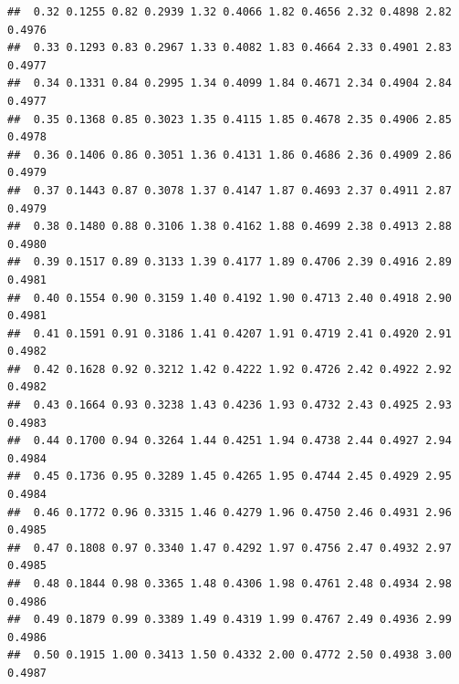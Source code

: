 \documentclass[onecolumn,12pt]{book}\usepackage[]{graphicx}\usepackage[]{color}
\makeatletter
\newenvironment{kframe}{%
 \def\at@end@of@kframe{}%
 \ifinner\ifhmode%
  \def\at@end@of@kframe{\end{minipage}}%
  \begin{minipage}{\columnwidth}%
 \fi\fi%
 \def\FrameCommand##1{\hskip\@totalleftmargin \hskip-\fboxsep
 \colorbox{shadecolor}{##1}\hskip-\fboxsep
     \hskip-\linewidth \hskip-\@totalleftmargin \hskip\columnwidth}%
 \MakeFramed {\advance\hsize-\width
   \@totalleftmargin\z@ \linewidth\hsize
   \@setminipage}}%
 {\par\unskip\endMakeFramed%
 \at@end@of@kframe}
\newenvironment{knitrout}{}{} %
\makeatother
\begin{document}
\begin{knitrout}
\begin{kframe}
\begin{verbatim}
##  0.32 0.1255 0.82 0.2939 1.32 0.4066 1.82 0.4656 2.32 0.4898 2.82 0.4976
##  0.33 0.1293 0.83 0.2967 1.33 0.4082 1.83 0.4664 2.33 0.4901 2.83 0.4977
##  0.34 0.1331 0.84 0.2995 1.34 0.4099 1.84 0.4671 2.34 0.4904 2.84 0.4977
##  0.35 0.1368 0.85 0.3023 1.35 0.4115 1.85 0.4678 2.35 0.4906 2.85 0.4978
##  0.36 0.1406 0.86 0.3051 1.36 0.4131 1.86 0.4686 2.36 0.4909 2.86 0.4979
##  0.37 0.1443 0.87 0.3078 1.37 0.4147 1.87 0.4693 2.37 0.4911 2.87 0.4979
##  0.38 0.1480 0.88 0.3106 1.38 0.4162 1.88 0.4699 2.38 0.4913 2.88 0.4980
##  0.39 0.1517 0.89 0.3133 1.39 0.4177 1.89 0.4706 2.39 0.4916 2.89 0.4981
##  0.40 0.1554 0.90 0.3159 1.40 0.4192 1.90 0.4713 2.40 0.4918 2.90 0.4981
##  0.41 0.1591 0.91 0.3186 1.41 0.4207 1.91 0.4719 2.41 0.4920 2.91 0.4982
##  0.42 0.1628 0.92 0.3212 1.42 0.4222 1.92 0.4726 2.42 0.4922 2.92 0.4982
##  0.43 0.1664 0.93 0.3238 1.43 0.4236 1.93 0.4732 2.43 0.4925 2.93 0.4983
##  0.44 0.1700 0.94 0.3264 1.44 0.4251 1.94 0.4738 2.44 0.4927 2.94 0.4984
##  0.45 0.1736 0.95 0.3289 1.45 0.4265 1.95 0.4744 2.45 0.4929 2.95 0.4984
##  0.46 0.1772 0.96 0.3315 1.46 0.4279 1.96 0.4750 2.46 0.4931 2.96 0.4985
##  0.47 0.1808 0.97 0.3340 1.47 0.4292 1.97 0.4756 2.47 0.4932 2.97 0.4985
##  0.48 0.1844 0.98 0.3365 1.48 0.4306 1.98 0.4761 2.48 0.4934 2.98 0.4986
##  0.49 0.1879 0.99 0.3389 1.49 0.4319 1.99 0.4767 2.49 0.4936 2.99 0.4986
##  0.50 0.1915 1.00 0.3413 1.50 0.4332 2.00 0.4772 2.50 0.4938 3.00 0.4987
\end{verbatim}
\end{kframe}
\end{knitrout}
\vfill\eject
\end{document}
